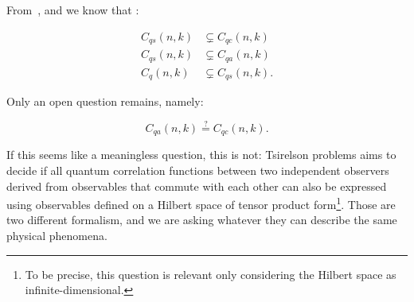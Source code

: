 From~\cite{ts1}, \cite{ts2} and \cite{ts3} we know that :

\begin{theorem}
    \begin{align}
    C_{q s}(n, k) &\subsetneq C_{q c}(n, k) \\
     C_{q s}(n, k) &\subsetneq C_{q a}(n, k) \\
    C_{q}(n, k) &\subsetneq C_{q s}(n, k).
    \end{align}
\end{theorem}

Only an open question remains, namely: 

\begin{problem}
    \begin{equation}
    C_{q a}(n, k) \stackrel{?}= C_{q c}(n, k).
    \end{equation}
\end{problem}

If this seems like a meaningless question, this is not: Tsirelson problems aims to decide if all quantum correlation functions between two independent observers derived from observables that commute with each other can also be expressed using observables defined on a Hilbert space of tensor product form\footnote{To be precise, this question is relevant only considering the Hilbert space as infinite-dimensional.}. Those are two different formalism, and we are asking whatever they can describe the same physical phenomena.